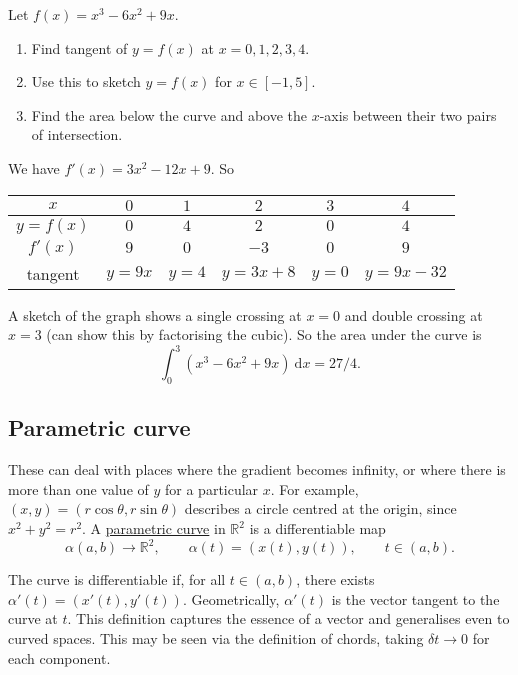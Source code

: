 \documentclass[10pt,notitlepage]{revtex4-1}
\newenvironment{example}[1][Example]{\begin{trivlist}
\item[\hskip \labelsep {\bfseries #1}]}{\end{trivlist}}
\begin{document}
\begin{example}
	Let $f(x)=x^3-6x^2 + 9x$.
	\begin{enumerate}
		\item Find tangent of $y=f(x)$ at $x=0,1,2,3,4$.
		\item Use this to sketch $y=f(x)$ for $x\in[-1,5]$.
		\item Find the area below the curve and above the $x$-axis between their
		two pairs of intersection.
	\end{enumerate}
	
	We have $f'(x)=3x^2-12x+9$. So
	
	\begin{tabular}{|c|c|c|c|c|c|}
		\hline
		$x$ & $0$ & $1$ & $2$ & $3$ & $4$\\
		\hline
		$y=f(x)$ & $0$ & $4$ & $2$ & $0$ & $4$\\
		\hline
		$f'(x)$ & $9$ & $0$ & $-3$ & $0$ & $9$\\
		\hline
		tangent & $y=9x$ & $y=4$ & $y=3x+8$ & $y=0$ & $y=9x-32$\\
		\hline
	\end{tabular}
	
	A sketch of the graph shows a single crossing at $x=0$ and double crossing
	at $x=3$ (can show this by factorising the cubic). So the area under the
	curve is
	\begin{equation}
		\int_0^3 (x^3-6x^2+9x)\ \mathrm{d}x=27/4.
	\end{equation}
\end{example}


\subsection{Parametric curve}

These can deal with places where the gradient becomes infinity, or where there
is more than one value of $y$ for a particular $x$. For example,
$(x,y)=(r\cos\theta,r\sin\theta)$ describes a circle centred at the origin,
since $x^2 + y^2 = r^2$. A \underline{parametric curve} in $\mathbb{R}^2$ is a
differentiable map
\begin{equation}
	\alpha(a,b)\rightarrow\mathbb{R}^2,\qquad \alpha(t)=(x(t),y(t)),\qquad
	t\in(a,b).
\end{equation}

The curve is differentiable if, for all $t\in(a,b)$, there exists
$\alpha'(t)=(x'(t),y'(t))$. Geometrically, $\alpha'(t)$ is the vector tangent to
the curve at $t$. This definition captures the essence of a vector and
generalises even to curved spaces. This may be seen via the definition of
chords, taking $\delta t\rightarrow0$ for each component.
\end{document}
